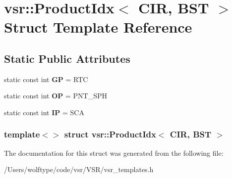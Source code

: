 \hypertarget{structvsr_1_1_product_idx_3_01_c_i_r_00_01_b_s_t_01_4}{\section{vsr\-:\-:Product\-Idx$<$ C\-I\-R, B\-S\-T $>$ Struct Template Reference}
\label{structvsr_1_1_product_idx_3_01_c_i_r_00_01_b_s_t_01_4}
}
\subsection*{Static Public Attributes}
\begin{DoxyCompactItemize}
\item 
\hypertarget{structvsr_1_1_product_idx_3_01_c_i_r_00_01_b_s_t_01_4_aa5aa8dbacaed7210b3629ff844b85a87}{static const int {\bfseries G\-P} = R\-T\-C}\label{structvsr_1_1_product_idx_3_01_c_i_r_00_01_b_s_t_01_4_aa5aa8dbacaed7210b3629ff844b85a87}

\item 
\hypertarget{structvsr_1_1_product_idx_3_01_c_i_r_00_01_b_s_t_01_4_aed6ace95072b48cf6fb9831b9d676c49}{static const int {\bfseries O\-P} = P\-N\-T\-\_\-\-S\-P\-H}\label{structvsr_1_1_product_idx_3_01_c_i_r_00_01_b_s_t_01_4_aed6ace95072b48cf6fb9831b9d676c49}

\item 
\hypertarget{structvsr_1_1_product_idx_3_01_c_i_r_00_01_b_s_t_01_4_abb52998c2d112e499bd2879a6c650c92}{static const int {\bfseries I\-P} = S\-C\-A}\label{structvsr_1_1_product_idx_3_01_c_i_r_00_01_b_s_t_01_4_abb52998c2d112e499bd2879a6c650c92}

\end{DoxyCompactItemize}
\subsubsection*{template$<$$>$ struct vsr\-::\-Product\-Idx$<$ C\-I\-R, B\-S\-T $>$}



The documentation for this struct was generated from the following file\-:\begin{DoxyCompactItemize}
\item 
/\-Users/wolftype/code/vsr/\-V\-S\-R/vsr\-\_\-templates.\-h\end{DoxyCompactItemize}

